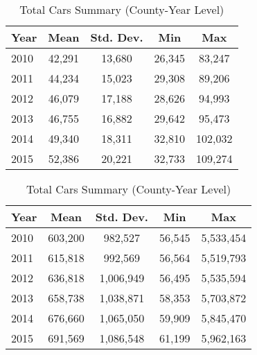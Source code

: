 \documentclass[12pt]{article}
\begin{document}
	\begin{table}[h]
		\centering
		\begin{minipage}{0.48\textwidth}
			\centering
			\caption{Income Per Capita Summary (County-Year Level)}
			\label{tab:income_summary}
			\begin{tabular}{l c c c c}
				\toprule
				Year & Mean & Std. Dev. & Min & Max \\
				\midrule
				2010 & 42,291 & 13,680 & 26,345 & 83,247 \\
				2011 & 44,234 & 15,023 & 29,308 & 89,206 \\
				2012 & 46,079 & 17,188 & 28,626 & 94,993 \\
				2013 & 46,755 & 16,882 & 29,642 & 95,473 \\
				2014 & 49,340 & 18,311 & 32,810 & 102,032 \\
				2015 & 52,386 & 20,221 & 32,733 & 109,274 \\
				\bottomrule
			\end{tabular}
		\end{minipage}
		\hfill
		\begin{minipage}{0.48\textwidth}
			\centering
			\caption{Total Cars Summary (County-Year Level)}
			\label{tab:total_cars_summary}
			\begin{tabular}{l c c c c}
				\toprule
				Year & Mean & Std. Dev. & Min & Max \\
				\midrule
				2010 & 603,200 & 982,527 & 56,545 & 5,533,454 \\
				2011 & 615,818 & 992,569 & 56,564 & 5,519,793 \\
				2012 & 636,818 & 1,006,949 & 56,495 & 5,535,594 \\
				2013 & 658,738 & 1,038,871 & 58,353 & 5,703,872 \\
				2014 & 676,660 & 1,065,050 & 59,909 & 5,845,470 \\
				2015 & 691,569 & 1,086,548 & 61,199 & 5,962,163 \\
				\bottomrule
			\end{tabular}
		\end{minipage}
	\end{table}
	
	
	\clearpage
	
\end{document}
